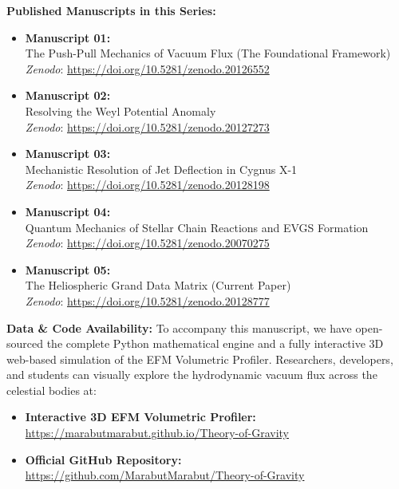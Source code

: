 \documentclass[11pt, a4paper]{article}
\begin{document}
  \vspace{1em}
  \noindent \textbf{Published Manuscripts in this Series:}
  \begin{itemize}
    \item \textbf{Manuscript 01:} \\ The Push-Pull Mechanics of Vacuum Flux (The Foundational Framework) \\ \textit{Zenodo}: \url{https://doi.org/10.5281/zenodo.20126552}
    
    \item \textbf{Manuscript 02:} \\ Resolving the Weyl Potential Anomaly \\ \textit{Zenodo}: \url{https://doi.org/10.5281/zenodo.20127273}

    \item \textbf{Manuscript 03:} \\ Mechanistic Resolution of Jet Deflection in Cygnus X-1 \\ \textit{Zenodo}: \url{https://doi.org/10.5281/zenodo.20128198}

    \item \textbf{Manuscript 04:} \\ Quantum Mechanics of Stellar Chain Reactions and EVGS Formation \\ \textit{Zenodo}: \url{https://doi.org/10.5281/zenodo.20070275}

    \item \textbf{Manuscript 05:} \\ The Heliospheric Grand Data Matrix (Current Paper) \\ \textit{Zenodo}: \url{https://doi.org/10.5281/zenodo.20128777}
  \end{itemize}

  \vspace{1em}
  \noindent \textbf{Data \& Code Availability:} To accompany this manuscript, we have open-sourced the complete Python mathematical engine and a fully interactive 3D web-based simulation of the EFM Volumetric Profiler. Researchers, developers, and students can visually explore the hydrodynamic vacuum flux across the celestial bodies at: 
  \begin{itemize}
    \item \textbf{Interactive 3D EFM Volumetric Profiler:} \\ \url{https://marabutmarabut.github.io/Theory-of-Gravity}
    
    \item \textbf{Official GitHub Repository:} \\ \url{https://github.com/MarabutMarabut/Theory-of-Gravity}
  \end{itemize}
\end{document}
